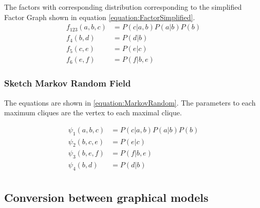 \documentclass[a4paper,12pt]{article}
\begin{document}
The factors with corresponding distribution corresponding to the simplified Factor Graph shown in equation \ref{equation:FactorSimplified}.
\begin{equation}
\label{equation:FactorSimplified}
\begin{split}
f_{123}(a,b,c) & = P(c|a,b) P(a|b)P(b)  \\
f_{4}(b,d) & = P(d|b) \\
f_{5}(c,e) & = P(e|c) \\
f_{6}(e,f) & = P(f|b,e) 
\end{split}
\end{equation}

\clearpage

\subsubsection{Sketch Markov Random Field}

\begin{figure}[!htb]
\centering
{}
\end{figure}

The equations are shown in \ref{equation:MarkovRandom}. The parameters to each maximum cliques are the vertex to each maximal clique. 

\begin{equation}
\label{equation:MarkovRandom}
\begin{split}
\psi_{1}(a,b,c) &= P(c|a,b)P(a|b)P(b) \\
\psi_{2}(b,c,e) &=  P(e|c) \\
\psi_{3}(b,e,f) &= P(f|b,e) \\
\psi_{4}(b,d) &= P(d|b) \\
\end{split}
\end{equation}

\clearpage
\subsection{Conversion between graphical models}
\end{document}
